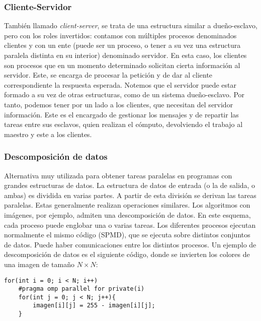 \subsubsection{Cliente-Servidor} 
También llamado \emph{client-server}, se trata de una estructura similar a dueño-esclavo, pero con los roles invertidos: contamos con múltiples procesos denominados clientes y con un ente (puede ser un proceso, o tener a su vez una estructura paralela distinta en su interior) denominado servidor. En esta caso, los clientes son procesos que en un momento determinado solicitan cierta información al servidor. Este, se encarga de procesar la petición y de dar al cliente correspondiente la respuesta esperada. 
Notemos que el servidor puede estar formado a su vez de otras estructuras, como de un sistema dueño-esclavo. Por tanto, podemos tener por un lado a los clientes, que necesitan del servidor información. Este es el encargado de gestionar los mensajes y de repartir las tareas entre sus esclavos, quien realizan el cómputo, devolviendo el trabajo al maestro y este a los clientes. 

\subsubsection{Descomposición de datos} 
Alternativa muy utilizada para obtener tareas paralelas en programas con grandes estructuras de datos. La estructura de datos de entrada (o la de salida, o ambas) es dividida en varias partes. A partir de esta división se derivan las tareas paralelas. Estas generalmente realizan operaciones similares. Los algoritmos con imágenes, por ejemplo, admiten una descomposición de datos.
En este esquema, cada proceso puede englobar una o varias tareas. Los diferentes procesos ejecutan normalmente el mismo código (SPMD), que se ejecuta sobre distintos conjuntos de datos. Puede haber comunicaciones entre los distintos procesos.
Un ejemplo de descomposición de datos es el siguiente código, donde se invierten los colores de una imagen de tamaño $N\times N$:
    \begin{verbatim}
for(int i = 0; i < N; i++)
    #pragma omp parallel for private(i)
    for(int j = 0; j < N; j++){
        imagen[i][j] = 255 - imagen[i][j];
    }
    \end{verbatim}

